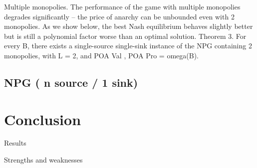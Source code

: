 \documentclass{beamer}
\begin{document}
\begin{frame}
Multiple monopolies. The performance of the game with multiple monopolies
degrades significantly – the price of anarchy can be unbounded even with 2
monopolies. As we show below, the best Nash equilibrium behaves slightly better
but is still a polynomial factor worse than an optimal solution.
Theorem 3. For every B, there exists a single-source single-sink instance of
the NPG containing 2 monopolies, with L = 2, and POA Val , POA Pro = omega(B).
\end{frame}


\subsection{NPG ( n source / 1 sink)}


\section{Conclusion}

\begin{frame}{Results}
\end{frame}

\begin{frame}{Strengths and weaknesses}
\end{frame}
\end{document}
